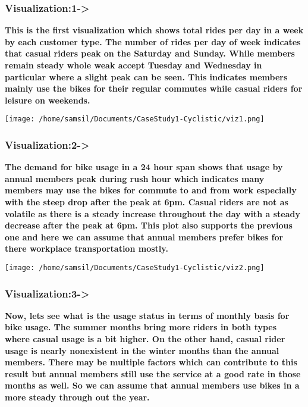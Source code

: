 \documentclass[
]{article}
\begin{document}
\hypertarget{visualization1-}{%
\subsubsection{\texorpdfstring{\textbf{Visualization:1-\textgreater{}}}{Visualization:1-\textgreater{}}}\label{visualization1-}}

\textbf{This is the first visualization which shows total rides per day
in a week by each customer type. The number of rides per day of week
indicates that casual riders peak on the Saturday and Sunday. While
members remain steady whole weak accept Tuesday and Wednesday in
particular where a slight peak can be seen. This indicates members
mainly use the bikes for their regular commutes while casual riders for
leisure on weekends.}

\texttt{[image: /home/samsil/Documents/CaseStudy1-Cyclistic/viz1.png]}

\hypertarget{visualization2-}{%
\subsubsection{\texorpdfstring{\textbf{Visualization:2-\textgreater{}}}{Visualization:2-\textgreater{}}}\label{visualization2-}}

\textbf{The demand for bike usage in a 24 hour span shows that usage by
annual members peak during rush hour which indicates many members may
use the bikes for commute to and from work especially with the steep
drop after the peak at 6pm. Casual riders are not as volatile as there
is a steady increase throughout the day with a steady decrease after the
peak at 6pm. This plot also supports the previous one and here we can
assume that annual members prefer bikes for there workplace
transportation mostly.}

\texttt{[image: /home/samsil/Documents/CaseStudy1-Cyclistic/viz2.png]}

\hypertarget{visualization3-}{%
\subsubsection{\texorpdfstring{\textbf{Visualization:3-\textgreater{}}}{Visualization:3-\textgreater{}}}\label{visualization3-}}

\textbf{Now, lets see what is the usage status in terms of monthly basis
for bike usage. The summer months bring more riders in both types where
casual usage is a bit higher. On the other hand, casual rider usage is
nearly nonexistent in the winter months than the annual members. There
may be multiple factors which can contribute to this result but annual
members still use the service at a good rate in those months as well. So
we can assume that annual members use bikes in a more steady through out
the year.}
\end{document}
